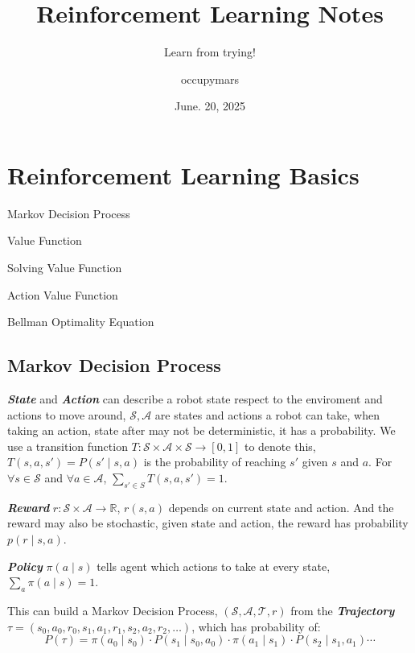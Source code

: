 \documentclass[10pt]{elegantbook}
\title{Reinforcement Learning Notes}
\subtitle{Learn from trying!}
\author{occupymars}
\date{June. 20, 2025}
\newcommand{\mydefination}[1]{\textbf{\textit{\textcolor{structurecolor}{#1}}}}
\begin{document}
\maketitle

\frontmatter
\tableofcontents

\mainmatter

\chapter{Reinforcement Learning Basics}

\begin{introduction}
    \item Markov Decision Process
    \item Value Function
    \item Solving Value Function
    \item Action Value Function
    \item Bellman Optimality Equation
\end{introduction}
    
\section{Markov Decision Process}
\mydefination{State} and \mydefination{Action} can describe a robot state respect to the enviroment and actions to move around, 
$\mathcal S, \mathcal A$ are states and actions a robot can take, when taking an action, state after may not
be deterministic, it has a probability. We use a transition function $T: \mathcal S \times \mathcal A \times 
\mathcal S \rightarrow [0, 1]$ to denote this, $T(s, a, s') = P(s' \mid s,a)$ is the probability of reaching $s'$
given $s$ and $a$. For $\forall s \in \mathcal S$ and $\forall a \in \mathcal A$, $\sum_{s'\in S}T(s, a, s') = 1$. 

\mydefination{Reward} $r:\mathcal S \times \mathcal A \rightarrow \mathbb R$, $r(s,a)$ depends on current state and action. And the reward
may also be stochastic, given state and action, the reward has probability $p(r \mid s, a)$.

\mydefination{Policy} $\pi(a \mid s)$ tells agent which actions to take at every state, $\sum_a \pi(a \mid s) = 1$.

This can build a Markov Decision Process, $(\mathcal S, \mathcal A, \mathcal T, r)$ from the \mydefination{Trajectory} 
$\tau = (s_0, a_0, r_0, s_1, a_1, r_1, s_2, a_2, r_2, \ldots)$, which has probability of:
\[ P(\tau) = \pi(a_0\mid s_0) \cdot P(s_1 \mid s_0, a_0) \cdot \pi(a_1\mid s_1) \cdot P(s_2 \mid s_1, a_1) \cdots \] 
\end{document}
